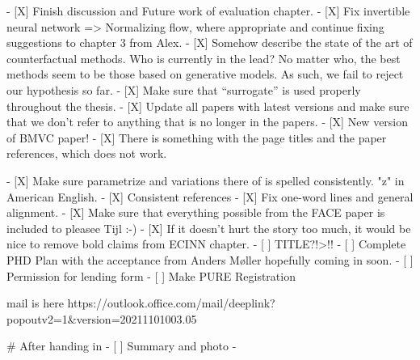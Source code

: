   - [X] Finish discussion and Future work of evaluation chapter.
  - [X] Fix invertible neural network => Normalizing flow, where appropriate and continue fixing suggestions to chapter 3 from Alex.
  - [X] Somehow describe the state of the art of counterfactual methods. Who is currently in the lead? No matter who, the best methods seem to be those based on generative models. As such, we fail to reject our hypothesis so far. 
  - [X] Make sure that ``surrogate'' is used properly throughout the thesis. 
  - [X] Update all papers with latest versions and make sure that we don't refer to anything that is no longer in the papers. 
  - [X] New version of BMVC paper!
  - [X] There is something with the page titles and the paper references, which does not work.
  
  - [X] Make sure parametrize and variations there of is spelled consistently. "z" in American English.
  - [X] Consistent references
  - [X] Fix one-word lines and general alignment.
  - [X] Make sure that everything possible from the FACE paper is included to pleasee Tijl :-)
  - [X] If it doesn't hurt the story too much, it would be nice to remove bold claims from ECINN chapter.
  - [ ] TITLE?!>!!
  - [ ] Complete PHD Plan with the acceptance from Anders Møller hopefully coming in soon. 
  - [ ] Permission for lending form
  - [ ] Make PURE Registration  
  
  mail is here https://outlook.office.com/mail/deeplink?popoutv2=1&version=20211101003.05
  
  # After handing in
  - [ ] Summary and photo
  - 